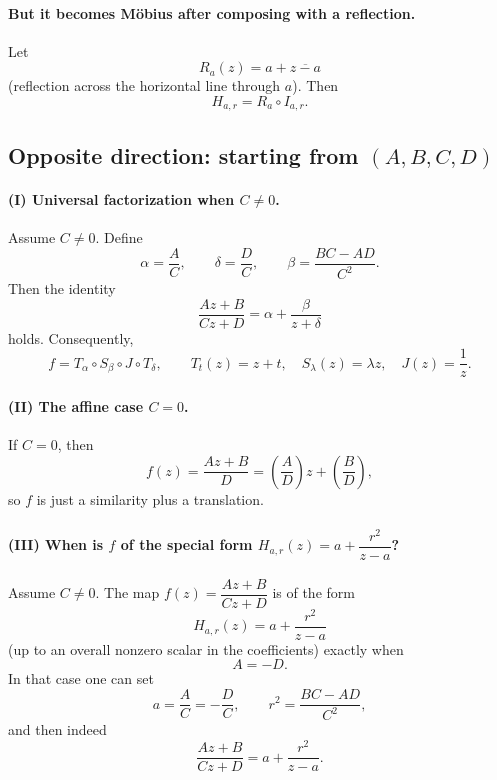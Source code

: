 \documentclass[12pt,a4paper]{article}
\theoremstyle{plain}
\theoremstyle{definition}      %
\begin{document}
	\paragraph{\textbf{But it becomes Möbius after composing with a reflection.}}
	Let
	\[
	R_a(z)=a+\overline{z-a}
	\]
	(reflection across the horizontal line through $a$). Then
	\[
	H_{a,r}=R_a\circ I_{a,r}.
	\]
	
	
	\subsection*{\textbf{Opposite direction: starting from $(A,B,C,D)$}}
	
	\paragraph{\textbf{(I) Universal factorization when $C\neq 0$.}}
	Assume $C\neq 0$. Define
	\[
	\alpha=\frac{A}{C},\qquad
	\delta=\frac{D}{C},\qquad
	\beta=\frac{BC-AD}{C^{2}}.
	\]
	Then the identity
	\[
	\frac{Az+B}{Cz+D}=\alpha+\frac{\beta}{z+\delta}
	\]
	holds. Consequently,
	\[
	f=T_{\alpha}\circ S_{\beta}\circ J\circ T_{\delta},
	\qquad
	T_t(z)=z+t,\quad S_\lambda(z)=\lambda z,\quad J(z)=\frac{1}{z}.
	\]
	
	\paragraph{\textbf{(II) The affine case $C=0$.}}
	If $C=0$, then
	\[
	f(z)=\frac{Az+B}{D}=\left(\frac{A}{D}\right)z+\left(\frac{B}{D}\right),
	\]
	so $f$ is just a similarity plus a translation.
	
	\paragraph{\textbf{(III) When is $f$ of the special form $H_{a,r}(z)=a+\dfrac{r^{2}}{z-a}$?}}
	Assume $C\neq 0$. The map $f(z)=\dfrac{Az+B}{Cz+D}$ is of the form
	\[
	H_{a,r}(z)=a+\frac{r^{2}}{z-a}
	\]
	(up to an overall nonzero scalar in the coefficients) exactly when
	\[
	A=-D.
	\]
	In that case one can set
	\[
	a=\frac{A}{C}=-\frac{D}{C},
	\qquad
	r^{2}=\frac{BC-AD}{C^{2}},
	\]
	and then indeed
	\[
	\frac{Az+B}{Cz+D}=a+\frac{r^{2}}{z-a}.
	\]
	
	
	
\end{document}
